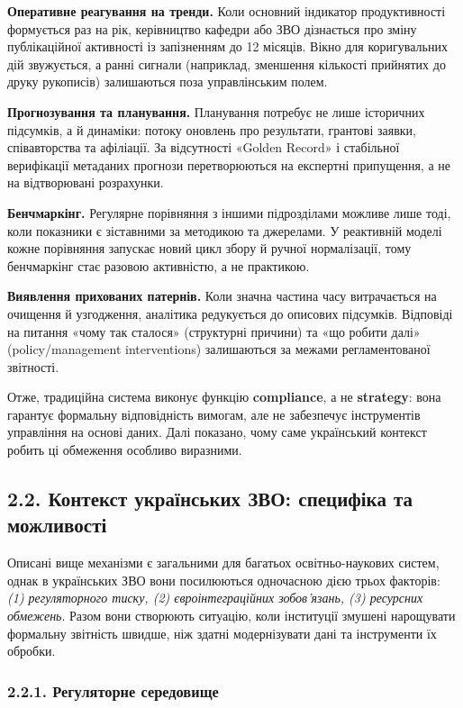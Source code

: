 \textbf{Оперативне реагування на тренди.} Коли основний індикатор продуктивності формується раз на рік, керівництво кафедри або ЗВО дізнається про зміну публікаційної активності із запізненням до 12 місяців. Вікно для коригувальних дій звужується, а ранні сигнали (наприклад, зменшення кількості прийнятих до друку рукописів) залишаються поза управлінським полем.

\textbf{Прогнозування та планування.} Планування потребує не лише історичних підсумків, а й динаміки: потоку оновлень про результати, грантові заявки, співавторства та афіліації. За відсутності «Golden Record» і стабільної верифікації метаданих прогнози перетворюються на експертні припущення, а не на відтворювані розрахунки.

\textbf{Бенчмаркінг.} Регулярне порівняння з іншими підрозділами можливе лише тоді, коли показники є зіставними за методикою та джерелами. У реактивній моделі кожне порівняння запускає новий цикл збору й ручної нормалізації, тому бенчмаркінг стає разовою активністю, а не практикою.

\textbf{Виявлення прихованих патернів.} Коли значна частина часу витрачається на очищення й узгодження, аналітика редукується до описових підсумків. Відповіді на питання «чому так сталося» (структурні причини) та «що робити далі» (policy/management interventions) залишаються за межами регламентованої звітності.

Отже, традиційна система виконує функцію \textbf{compliance}, а не \textbf{strategy}: вона гарантує формальну відповідність вимогам, але не забезпечує інструментів управління на основі даних. Далі показано, чому саме український контекст робить ці обмеження особливо виразними.

\subsection*{2.2. Контекст українських ЗВО: специфіка та можливості}

Описані вище механізми є загальними для багатьох освітньо-наукових систем, однак в українських ЗВО вони посилюються одночасною дією трьох факторів: \textit{(1) регуляторного тиску, (2) євроінтеграційних зобов'язань, (3) ресурсних обмежень}. Разом вони створюють ситуацію, коли інституції змушені нарощувати формальну звітність швидше, ніж здатні модернізувати дані та інструменти їх обробки.

\subsubsection*{2.2.1. Регуляторне середовище}

